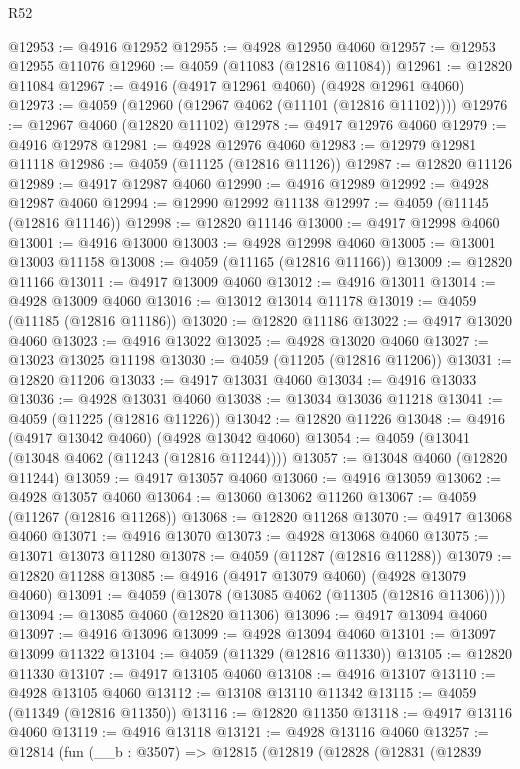 \begin{lexlean}{R52}
\begin{coremodule}
@12953 := @4916 @12952
@12955 := @4928 @12950 @4060
@12957 := @12953 @12955 @11076
@12960 := @4059 (@11083 (@12816 @11084))
@12961 := @12820 @11084
@12967 := @4916 (@4917 @12961 @4060) (@4928 @12961 @4060)
@12973 := @4059 (@12960 (@12967 @4062 (@11101 (@12816 @11102))))
@12976 := @12967 @4060 (@12820 @11102)
@12978 := @4917 @12976 @4060
@12979 := @4916 @12978
@12981 := @4928 @12976 @4060
@12983 := @12979 @12981 @11118
@12986 := @4059 (@11125 (@12816 @11126))
@12987 := @12820 @11126
@12989 := @4917 @12987 @4060
@12990 := @4916 @12989
@12992 := @4928 @12987 @4060
@12994 := @12990 @12992 @11138
@12997 := @4059 (@11145 (@12816 @11146))
@12998 := @12820 @11146
@13000 := @4917 @12998 @4060
@13001 := @4916 @13000
@13003 := @4928 @12998 @4060
@13005 := @13001 @13003 @11158
@13008 := @4059 (@11165 (@12816 @11166))
@13009 := @12820 @11166
@13011 := @4917 @13009 @4060
@13012 := @4916 @13011
@13014 := @4928 @13009 @4060
@13016 := @13012 @13014 @11178
@13019 := @4059 (@11185 (@12816 @11186))
@13020 := @12820 @11186
@13022 := @4917 @13020 @4060
@13023 := @4916 @13022
@13025 := @4928 @13020 @4060
@13027 := @13023 @13025 @11198
@13030 := @4059 (@11205 (@12816 @11206))
@13031 := @12820 @11206
@13033 := @4917 @13031 @4060
@13034 := @4916 @13033
@13036 := @4928 @13031 @4060
@13038 := @13034 @13036 @11218
@13041 := @4059 (@11225 (@12816 @11226))
@13042 := @12820 @11226
@13048 := @4916 (@4917 @13042 @4060) (@4928 @13042 @4060)
@13054 := @4059 (@13041 (@13048 @4062 (@11243 (@12816 @11244))))
@13057 := @13048 @4060 (@12820 @11244)
@13059 := @4917 @13057 @4060
@13060 := @4916 @13059
@13062 := @4928 @13057 @4060
@13064 := @13060 @13062 @11260
@13067 := @4059 (@11267 (@12816 @11268))
@13068 := @12820 @11268
@13070 := @4917 @13068 @4060
@13071 := @4916 @13070
@13073 := @4928 @13068 @4060
@13075 := @13071 @13073 @11280
@13078 := @4059 (@11287 (@12816 @11288))
@13079 := @12820 @11288
@13085 := @4916 (@4917 @13079 @4060) (@4928 @13079 @4060)
@13091 := @4059 (@13078 (@13085 @4062 (@11305 (@12816 @11306))))
@13094 := @13085 @4060 (@12820 @11306)
@13096 := @4917 @13094 @4060
@13097 := @4916 @13096
@13099 := @4928 @13094 @4060
@13101 := @13097 @13099 @11322
@13104 := @4059 (@11329 (@12816 @11330))
@13105 := @12820 @11330
@13107 := @4917 @13105 @4060
@13108 := @4916 @13107
@13110 := @4928 @13105 @4060
@13112 := @13108 @13110 @11342
@13115 := @4059 (@11349 (@12816 @11350))
@13116 := @12820 @11350
@13118 := @4917 @13116 @4060
@13119 := @4916 @13118
@13121 := @4928 @13116 @4060
@13257 := @12814
    (fun (__b : @3507) =>
    @12815
      (@12819
        (@12828
          (@12831
            (@12839

\end{coremodule}
\end{lexlean}
